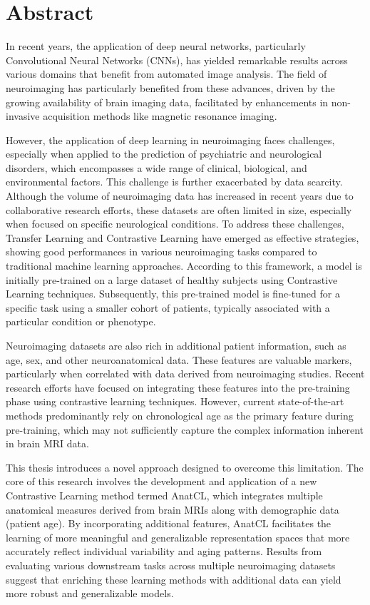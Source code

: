 \chapter*{Abstract}

In recent years, the application of deep neural networks, particularly
Convolutional Neural Networks (CNNs), has yielded remarkable results across
various domains that benefit from automated image analysis. The field of
neuroimaging has particularly benefited from these advances, driven by the
growing availability of brain imaging data, facilitated by enhancements in
non-invasive acquisition methods like magnetic resonance imaging. 

However, the application of deep learning in neuroimaging faces challenges,
especially when applied to the prediction of psychiatric and neurological
disorders, which encompasses a wide range of clinical, biological, and
environmental factors. This challenge is further exacerbated by data scarcity.
Although the volume of neuroimaging data has increased in recent years due to
collaborative research efforts, these datasets are often limited in size,
especially when focused on specific neurological conditions. To address these
challenges, Transfer Learning and Contrastive Learning have emerged as effective
strategies, showing good performances in various neuroimaging tasks compared to
traditional machine learning approaches. According to this framework, a model is
initially pre-trained on a large dataset of healthy subjects using Contrastive
Learning techniques. Subsequently, this pre-trained model is fine-tuned for a
specific task using a smaller cohort of patients, typically associated with a
particular condition or phenotype.

Neuroimaging datasets are also rich in additional patient information, such as
age, sex, and other neuroanatomical data. These features are valuable markers,
particularly when correlated with data derived from neuroimaging studies. Recent
research efforts have focused on integrating these features into the
pre-training phase using contrastive learning techniques. However, current
state-of-the-art methods predominantly rely on chronological age as the primary
feature during pre-training, which may not sufficiently capture the complex
information inherent in brain MRI data.

This thesis introduces a novel approach designed to overcome this limitation.
The core of this research involves the development and application of a new
Contrastive Learning method termed AnatCL, which integrates multiple anatomical
measures derived from brain MRIs along with demographic data (patient age). By
incorporating additional features, AnatCL facilitates the learning of more
meaningful and generalizable representation spaces that more accurately reflect
individual variability and aging patterns. Results from evaluating various
downstream tasks across multiple neuroimaging datasets suggest that enriching
these learning methods with additional data can yield more robust and
generalizable models.